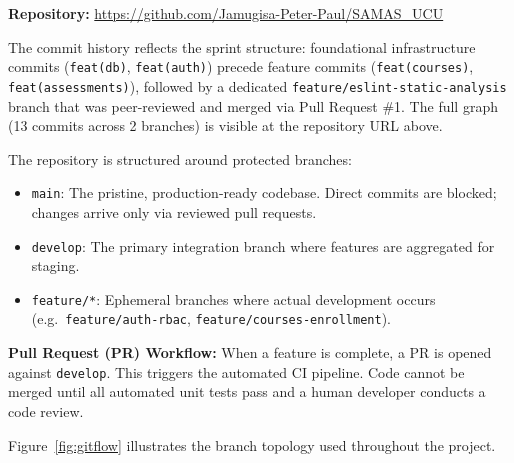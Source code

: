 \documentclass[12pt, a4paper]{report}
\begin{document}
\textbf{Repository:} \url{https://github.com/Jamugisa-Peter-Paul/SAMAS_UCU}

The commit history reflects the sprint structure: foundational infrastructure commits (\texttt{feat(db)}, \texttt{feat(auth)}) precede feature commits (\texttt{feat(courses)}, \texttt{feat(assessments)}), followed by a dedicated \texttt{feature/eslint-static-analysis} branch that was peer-reviewed and merged via Pull Request \#1. The full graph (13 commits across 2 branches) is visible at the repository URL above.

The repository is structured around protected branches:
\begin{itemize}[noitemsep]
    \item \texttt{main}: The pristine, production-ready codebase. Direct commits are blocked; changes arrive only via reviewed pull requests.
    \item \texttt{develop}: The primary integration branch where features are aggregated for staging.
    \item \texttt{feature/*}: Ephemeral branches where actual development occurs (e.g.\ \texttt{feature/auth-rbac}, \texttt{feature/courses-enrollment}).
\end{itemize}

\textbf{Pull Request (PR) Workflow:} When a feature is complete, a PR is opened against \texttt{develop}. This triggers the automated CI pipeline. Code cannot be merged until all automated unit tests pass and a human developer conducts a code review.

Figure~\ref{fig:gitflow} illustrates the branch topology used throughout the project.
\end{document}
